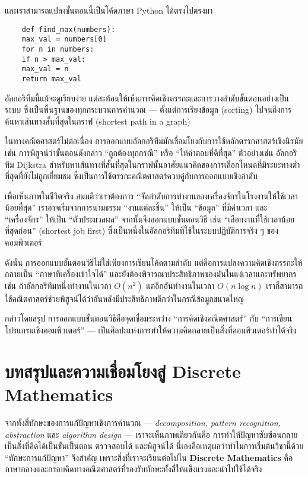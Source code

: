และเราสามารถแปลงขั้นตอนนี้เป็นโค้ดภาษา Python ได้ตรงไปตรงมา
\begin{verbatim}
	def find_max(numbers):
	max_val = numbers[0]
	for n in numbers:
	if n > max_val:
	max_val = n
	return max_val
\end{verbatim}

อัลกอริทึมนี้แม้จะดูเรียบง่าย แต่สะท้อนให้เห็นการคิดเชิงตรรกะและการวางลำดับขั้นตอนอย่างเป็นระบบ ซึ่งเป็นพื้นฐานของทุกกระบวนการคำนวณ — ตั้งแต่การเรียงข้อมูล (sorting) ไปจนถึงการค้นหาเส้นทางสั้นที่สุดในกราฟ (shortest path in a graph)

ในทางคณิตศาสตร์ไม่ต่อเนื่อง การออกแบบอัลกอริทึมมักเชื่อมโยงกับการใช้หลักตรรกศาสตร์เชิงนิรนัย เช่น การพิสูจน์ว่าขั้นตอนดังกล่าว “ถูกต้องทุกกรณี” หรือ “ให้คำตอบที่ดีที่สุด” ตัวอย่างเช่น อัลกอริทึม Dijkstra สำหรับหาเส้นทางที่สั้นที่สุดในกราฟนั้นอาศัยแนวคิดของการเลือกโหนดที่มีระยะทางต่ำที่สุดที่ยังไม่ถูกเยี่ยมชม ซึ่งเป็นการใช้ตรรกะคณิตศาสตร์ควบคู่กับการออกแบบเชิงลำดับ

เพื่อเห็นภาพในชีวิตจริง สมมติว่าเราต้องการ “จัดลำดับการทำงานของเครื่องจักรในโรงงานให้ใช้เวลาน้อยที่สุด” เราอาจเริ่มจากการนามธรรม “งานแต่ละชิ้น” ให้เป็น “ข้อมูล” ที่มีค่าเวลา และ “เครื่องจักร” ให้เป็น “ตัวประมวลผล” จากนั้นจึงออกแบบขั้นตอนวิธี เช่น “เลือกงานที่ใช้เวลาน้อยที่สุดก่อน” (shortest job first) ซึ่งเป็นหนึ่งในอัลกอริทึมที่ใช้ในระบบปฏิบัติการจริง ๆ ของคอมพิวเตอร์

ดังนั้น การออกแบบขั้นตอนวิธีไม่ใช่เพียงการเขียนโค้ดตามลำดับ แต่คือการแปลงความคิดเชิงตรรกะให้กลายเป็น “ภาษาที่เครื่องเข้าใจได้” และยังต้องพิจารณาประสิทธิภาพของมันในแง่เวลาและทรัพยากร เช่น ถ้าอัลกอริทึมหนึ่งทำงานในเวลา $O(n^2)$ แต่อีกอันทำงานในเวลา $O(n \log n)$ เราก็สามารถใช้คณิตศาสตร์ช่วยพิสูจน์ได้ว่าอันหลังมีประสิทธิภาพดีกว่าในกรณีข้อมูลขนาดใหญ่

กล่าวโดยสรุป การออกแบบขั้นตอนวิธีคือจุดเชื่อมระหว่าง “การคิดเชิงคณิตศาสตร์” กับ “การเขียนโปรแกรมเชิงคอมพิวเตอร์” — เป็นศิลปะแห่งการทำให้ความคิดกลายเป็นสิ่งที่คอมพิวเตอร์ทำได้จริง

\section*{บทสรุปและความเชื่อมโยงสู่ Discrete Mathematics}

จากทั้งสี่ทักษะของการแก้ปัญหาเชิงการคำนวณ — \textit{decomposition, pattern recognition, abstraction} และ \textit{algorithm design} — เราจะเห็นภาพเดียวกันคือ การทำให้ปัญหาซับซ้อนกลายเป็นสิ่งที่คิดได้เป็นขั้นเป็นตอน ตรวจสอบได้ และพิสูจน์ได้ นี่เองคือเหตุผลว่าทำไมการเริ่มต้นวิชานี้ด้วย “ทักษะการแก้ปัญหา” จึงสำคัญ เพราะสิ่งที่เราจะเรียนต่อไปใน \textbf{Discrete Mathematics} คือภาษากลางและกรอบคิดทางคณิตศาสตร์ที่รองรับทักษะทั้งสี่ให้แข็งแรงและนำไปใช้ได้จริง

